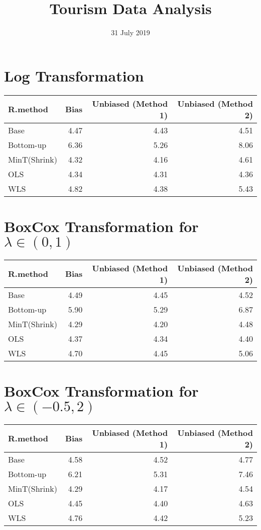 \documentclass[]{article}
\title{Tourism Data Analysis}
\author{}
\date{31 July 2019}
\begin{document}
\maketitle

\section{Log Transformation}\label{log-transformation}

\begin{tabular}{l|r|r|r}
\hline
R.method & Bias & Unbiased (Method 1) & Unbiased (Method 2)\\
\hline
Base & 4.47 & 4.43 & 4.51\\
\hline
Bottom-up & 6.36 & 5.26 & 8.06\\
\hline
MinT(Shrink) & 4.32 & 4.16 & 4.61\\
\hline
OLS & 4.34 & 4.31 & 4.36\\
\hline
WLS & 4.82 & 4.38 & 5.43\\
\hline
\end{tabular}

\section{\texorpdfstring{BoxCox Transformation for
\(\lambda \in (0,1)\)}{BoxCox Transformation for \textbackslash{}lambda \textbackslash{}in (0,1)}}\label{boxcox-transformation-for-lambda-in-01}

\begin{tabular}{l|r|r|r}
\hline
R.method & Bias & Unbiased (Method 1) & Unbiased (Method 2)\\
\hline
Base & 4.49 & 4.45 & 4.52\\
\hline
Bottom-up & 5.90 & 5.29 & 6.87\\
\hline
MinT(Shrink) & 4.29 & 4.20 & 4.48\\
\hline
OLS & 4.37 & 4.34 & 4.40\\
\hline
WLS & 4.70 & 4.45 & 5.06\\
\hline
\end{tabular}

\section{\texorpdfstring{BoxCox Transformation for
\(\lambda \in (-0.5,2)\)}{BoxCox Transformation for \textbackslash{}lambda \textbackslash{}in (-0.5,2)}}\label{boxcox-transformation-for-lambda-in--0.52}

\begin{tabular}{l|r|r|r}
\hline
R.method & Bias & Unbiased (Method 1) & Unbiased (Method 2)\\
\hline
Base & 4.58 & 4.52 & 4.77\\
\hline
Bottom-up & 6.21 & 5.31 & 7.46\\
\hline
MinT(Shrink) & 4.29 & 4.17 & 4.54\\
\hline
OLS & 4.45 & 4.40 & 4.63\\
\hline
WLS & 4.76 & 4.42 & 5.23\\
\hline
\end{tabular}
\end{document}
